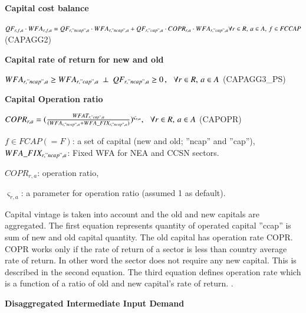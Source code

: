 \documentclass[10pt,a4paper,titlepage,dvipdfmx]{book}
\begin{document}
\begin{flushleft}\textbf{Capital cost balance}\end{flushleft}


\begin{center}$QF_{r,f,a}\cdot WFA_{r,f,a}=QF_{r,"ncap",a}\cdot WFA_{r,"ncap",a}+QF_{r,"cap",a}\cdot COPR_{r,a}\cdot WFA_{r,"cap",a}\forall r\in R,\,a\in A,\,f\in \textit{FCCAP}$   (CAPAGG2)
\end{center}

\begin{flushleft}\textbf{Capital rate of return for new and old}\end{flushleft}


\begin{center}$WFA_{r,"ncap",a}\geq WFA_{r,"cap",a}\,\,\,\bot \,\,\,QF_{r,"ncap",a}\geq 0\,,\,\,\,\,\forall r\in R,\,a\in A$ (CAPAGG3\_PS)
\end{center}

\begin{flushleft}\textbf{Capital Operation ratio}\end{flushleft}


\begin{center}$COPR_{r,a}=(\frac{WFAT_{r,"cap",a}}{(WFA_{r,"ncap",a}+WFA\_FIX_{r,"ncap",a})})^{{\varsigma _{r,a}}},\,\,\,\,\forall r\in R,\,a\in A$ (CAPOPR)
\end{center}

$f\in FCAP\left(=F\right)$: a set of capital (new and old; ''ncap'' and ''cap''),
$WFA\_FIX_{r,"ncap",a}$: Fixed WFA for NEA and CCSN sectors. 

\begin{flushleft}
$COPR_{r,a}$: operation ratio,

$\varsigma _{r,a}$: a parameter for operation ratio (assumed 1 as default).\\
\end{flushleft}

Capital vintage is taken into account and the old and new capitals are aggregated. The first equation represents quantity of operated capital ''ccap'' is sum of new and old capital quantity. The old capital has operation rate COPR. COPR works only if the rate of return of a sector is less than country average rate of return. In other word the sector does not require any new capital. This is described in the second equation. The third equation defines operation rate which is a function of a ratio of old and new capital's rate of return. .

\begin{flushleft}\textbf{Disaggregated Intermediate Input Demand}\end{flushleft}
\end{document}
